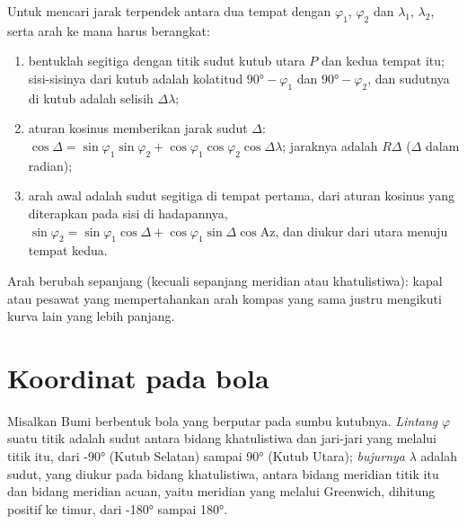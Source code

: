 \begin{method}\label{met:b1:spherical-astronomy:great-circle}
Untuk mencari jarak terpendek antara dua tempat dengan  $\varphi_1$,
$\varphi_2$ dan  $\lambda_1$, $\lambda_2$, serta arah ke mana harus berangkat:
\begin{enumerate}
  \item bentuklah segitiga dengan titik sudut kutub utara $P$ dan kedua tempat itu; sisi-sisinya dari kutub adalah kolatitud $\ang{90} -
        \varphi_1$ dan $\ang{90} - \varphi_2$, dan sudutnya di kutub adalah selisih  $\Delta\lambda$;
  \item aturan kosinus memberikan jarak sudut $\Delta$:
        $\cos\Delta = \sin\varphi_1\sin\varphi_2 +
        \cos\varphi_1\cos\varphi_2\cos\Delta\lambda$; jaraknya adalah
        $R\Delta$ ($\Delta$ dalam radian);
  \item arah awal adalah sudut segitiga di tempat pertama, dari aturan kosinus yang diterapkan pada sisi di hadapannya,
        $\sin\varphi_2 = \sin\varphi_1\cos\Delta + \cos\varphi_1\sin\Delta\cos
        \mathrm{Az}$, dan diukur dari utara menuju tempat kedua.
\end{enumerate}
Arah berubah sepanjang  (kecuali sepanjang meridian atau khatulistiwa): kapal atau pesawat yang mempertahankan arah kompas yang sama justru mengikuti kurva lain yang lebih panjang.
\end{method}

\section{Koordinat pada bola}

\begin{definition}\label{def:b1:spherical-astronomy:geographic}
Misalkan Bumi berbentuk bola yang berputar pada sumbu kutubnya. \emph{Lintang} $\varphi$ suatu titik adalah sudut antara bidang khatulistiwa dan jari-jari yang melalui titik itu, dari \ang{-90} (Kutub Selatan) sampai \ang{+90} (Kutub Utara); \emph{bujurnya} $\lambda$ adalah sudut, yang diukur pada bidang khatulistiwa, antara bidang meridian titik itu dan bidang meridian acuan, yaitu meridian yang melalui Greenwich, dihitung positif ke timur, dari \ang{-180} sampai \ang{180}.
\end{definition}

